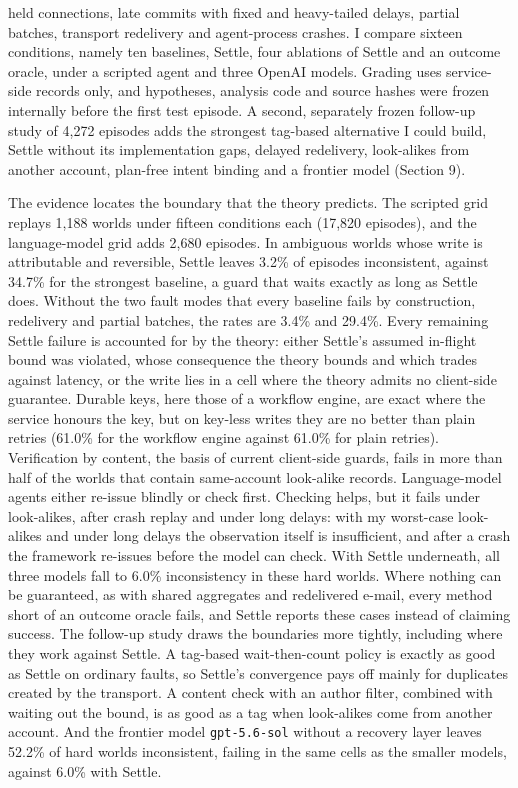 \documentclass[
  10pt,
]{article}
\begin{document}
\begin{enumerate}
  held connections, late commits with fixed and heavy-tailed delays,
  partial batches, transport redelivery and agent-process crashes. I
  compare sixteen conditions, namely ten baselines, Settle, four
  ablations of Settle and an outcome oracle, under a scripted agent and
  three OpenAI models. Grading uses service-side records only, and
  hypotheses, analysis code and source hashes were frozen internally
  before the first test episode. A second, separately frozen follow-up
  study of 4,272 episodes adds the strongest tag-based alternative I
  could build, Settle without its implementation gaps, delayed
  redelivery, look-alikes from another account, plan-free intent binding
  and a frontier model (Section 9).
\end{enumerate}

The evidence locates the boundary that the theory predicts. The scripted
grid replays 1,188 worlds under fifteen conditions each (17,820
episodes), and the language-model grid adds 2,680 episodes. In ambiguous
worlds whose write is attributable and reversible, Settle leaves 3.2\%
of episodes inconsistent, against 34.7\% for the strongest baseline, a
guard that waits exactly as long as Settle does. Without the two fault
modes that every baseline fails by construction, redelivery and partial
batches, the rates are 3.4\% and 29.4\%. Every remaining Settle failure
is accounted for by the theory: either Settle's assumed in-flight bound
was violated, whose consequence the theory bounds and which trades
against latency, or the write lies in a cell where the theory admits no
client-side guarantee. Durable keys, here those of a workflow engine,
are exact where the service honours the key, but on key-less writes they
are no better than plain retries (61.0\% for the workflow engine against
61.0\% for plain retries). Verification by content, the basis of current
client-side guards, fails in more than half of the worlds that contain
same-account look-alike records. Language-model agents either re-issue
blindly or check first. Checking helps, but it fails under look-alikes,
after crash replay and under long delays: with my worst-case look-alikes
and under long delays the observation itself is insufficient, and after
a crash the framework re-issues before the model can check. With Settle
underneath, all three models fall to 6.0\% inconsistency in these hard
worlds. Where nothing can be guaranteed, as with shared aggregates and
redelivered e-mail, every method short of an outcome oracle fails, and
Settle reports these cases instead of claiming success. The follow-up
study draws the boundaries more tightly, including where they work
against Settle. A tag-based wait-then-count policy is exactly as good as
Settle on ordinary faults, so Settle's convergence pays off mainly for
duplicates created by the transport. A content check with an author
filter, combined with waiting out the bound, is as good as a tag when
look-alikes come from another account. And the frontier model
\texttt{gpt-5.6-sol} without a recovery layer leaves 52.2\% of hard
worlds inconsistent, failing in the same cells as the smaller models,
against 6.0\% with Settle.
\end{document}
